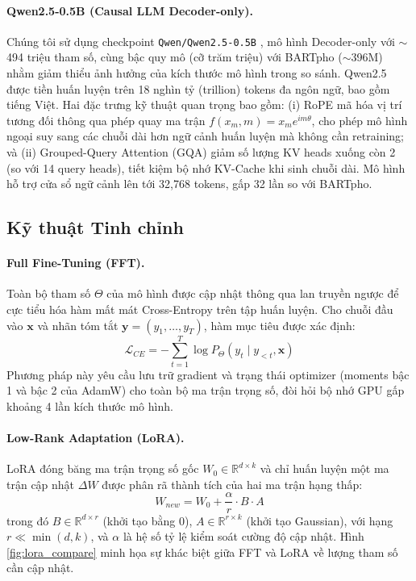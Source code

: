 \documentclass{article}
\begin{document}
\paragraph{Qwen2.5-0.5B (Causal LLM Decoder-only).}
Chúng tôi sử dụng checkpoint \texttt{Qwen/Qwen2.5-0.5B} \cite{qwen25}, mô hình Decoder-only với $\sim$494 triệu tham số, cùng bậc quy mô (cỡ trăm triệu) với BARTpho ($\sim$396M) nhằm giảm thiểu ảnh hưởng của kích thước mô hình trong so sánh. Qwen2.5 được tiền huấn luyện trên 18 nghìn tỷ (trillion) tokens đa ngôn ngữ, bao gồm tiếng Việt. Hai đặc trưng kỹ thuật quan trọng bao gồm: (i) RoPE \cite{rope} mã hóa vị trí tương đối thông qua phép quay ma trận $f(x_m, m) = x_m e^{im\theta}$, cho phép mô hình ngoại suy sang các chuỗi dài hơn ngữ cảnh huấn luyện mà không cần retraining; và (ii) Grouped-Query Attention (GQA) \cite{gqa} giảm số lượng KV heads xuống còn 2 (so với 14 query heads), tiết kiệm bộ nhớ KV-Cache khi sinh chuỗi dài. Mô hình hỗ trợ cửa sổ ngữ cảnh lên tới 32,768 tokens, gấp 32 lần so với BARTpho.

\subsection{Kỹ thuật Tinh chỉnh}

\paragraph{Full Fine-Tuning (FFT).}
Toàn bộ tham số $\Theta$ của mô hình được cập nhật thông qua lan truyền ngược để cực tiểu hóa hàm mất mát Cross-Entropy trên tập huấn luyện. Cho chuỗi đầu vào $\mathbf{x}$ và nhãn tóm tắt $\mathbf{y} = (y_1, \dots, y_T)$, hàm mục tiêu được xác định:
\begin{equation}
    \mathcal{L}_{CE} = -\sum_{t=1}^{T} \log P_\Theta(y_t \mid y_{<t}, \mathbf{x})
\end{equation}
Phương pháp này yêu cầu lưu trữ gradient và trạng thái optimizer (moments bậc 1 và bậc 2 của AdamW) cho toàn bộ ma trận trọng số, đòi hỏi bộ nhớ GPU gấp khoảng 4 lần kích thước mô hình.

\paragraph{Low-Rank Adaptation (LoRA).}
LoRA \cite{lora} đóng băng ma trận trọng số gốc $W_0 \in \mathbb{R}^{d \times k}$ và chỉ huấn luyện một ma trận cập nhật $\Delta W$ được phân rã thành tích của hai ma trận hạng thấp:
\begin{equation}
    W_{new} = W_0 + \frac{\alpha}{r} \cdot B \cdot A
\end{equation}
trong đó $B \in \mathbb{R}^{d \times r}$ (khởi tạo bằng 0), $A \in \mathbb{R}^{r \times k}$ (khởi tạo Gaussian), với hạng $r \ll \min(d, k)$, và $\alpha$ là hệ số tỷ lệ kiểm soát cường độ cập nhật. Hình \ref{fig:lora_compare} minh họa sự khác biệt giữa FFT và LoRA về lượng tham số cần cập nhật.
\end{document}
